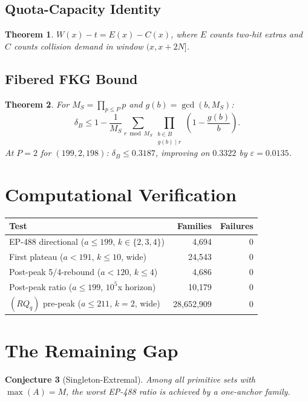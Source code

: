 \documentclass[11pt,a4paper]{article}
\newtheorem{theorem}{Theorem}[section]
\newtheorem{conjecture}[theorem]{Conjecture}
\theoremstyle{definition}
\begin{document}
\subsection{Quota-Capacity Identity}
\begin{theorem} $W(x) - t = E(x) - C(x)$, where $E$ counts two-hit extras and $C$ counts collision demand in window $(x, x+2N]$. \end{theorem}

\subsection{Fibered FKG Bound}
\begin{theorem}\label{thm:fibfkg} For $M_S = \prod_{p \leq P} p$ and $g(b) = \gcd(b, M_S)$:
\[ \delta_B \leq 1 - \frac{1}{M_S}\sum_{r \bmod M_S} \prod_{\substack{b \in B \\ g(b) \mid r}} \left(1 - \frac{g(b)}{b}\right). \]
At $P=2$ for $(199,2,198)$: $\delta_B \leq 0.3187$, improving on $0.3322$ by $\varepsilon = 0.0135$. \end{theorem}

\section{Computational Verification}

\begin{center}
\begin{tabular}{lrr}
\toprule
\textbf{Test} & \textbf{Families} & \textbf{Failures} \\ \midrule
EP-488 directional ($a \leq 199$, $k \in \{2,3,4\}$) & 4,694 & 0 \\
First plateau ($a < 191$, $k \leq 10$, wide) & 24,543 & 0 \\
Post-peak 5/4-rebound ($a < 120$, $k \leq 4$) & 4,686 & 0 \\
Post-peak ratio ($a \leq 199$, $10^5$x horizon) & 10,179 & 0 \\
$(RQ_q)$ pre-peak ($a \leq 211$, $k=2$, wide) & 28,652,909 & 0 \\ \bottomrule
\end{tabular}
\end{center}

\section{The Remaining Gap}

\begin{conjecture}[Singleton-Extremal] Among all primitive sets with $\max(A) = M$, the worst EP-488 ratio is achieved by a one-anchor family. \end{conjecture}
\end{document}
